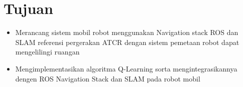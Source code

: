 \section{Tujuan}
\begin{itemize}
	\item Merancang sistem  mobil robot menggunakan Navigation stack ROS dan SLAM referensi  pergerakan ATCR dengan sistem pemetaan robot dapat mengelilingi ruangan
	\item Mengimplementasikan algoritma Q-Learning sorta mengintegrasikannya dengen ROS Navigation Stack dan SLAM pada robot mobil
\end{itemize}
   
    
    
